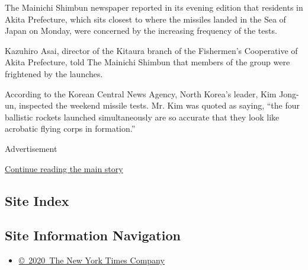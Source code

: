 The Mainichi Shimbun newspaper reported in its evening edition that
residents in Akita Prefecture, which sits closest to where the missiles
landed in the Sea of Japan on Monday, were concerned by the increasing
frequency of the tests.

Kazuhiro Asai, director of the Kitaura branch of the Fishermen's
Cooperative of Akita Prefecture, told The Mainichi Shimbun that members
of the group were frightened by the launches.

According to the Korean Central News Agency, North Korea's leader, Kim
Jong-un, inspected the weekend missile tests. Mr. Kim was quoted as
saying, ``the four ballistic rockets launched simultaneously are so
accurate that they look like acrobatic flying corps in formation.''

Advertisement

\protect\hyperlink{after-bottom}{Continue reading the main story}

\hypertarget{site-index}{%
\subsection{Site Index}\label{site-index}}

\hypertarget{site-information-navigation}{%
\subsection{Site Information
Navigation}\label{site-information-navigation}}

\begin{itemize}
\tightlist
\item
  \href{https://help.nytimes3xbfgragh.onion/hc/en-us/articles/115014792127-Copyright-notice}{©~2020~The
  New York Times Company}
\end{itemize}

